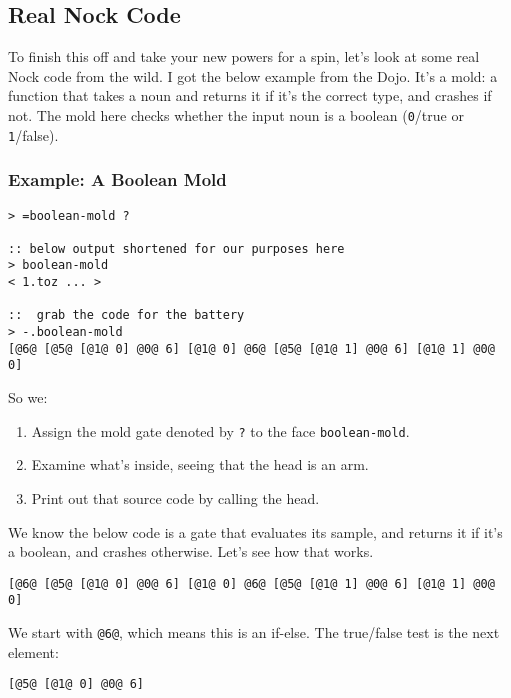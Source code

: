 \documentclass[twoside]{article}
\begin{document}
\subsection{Real Nock Code}

To finish this off and take your new powers for a spin, let's look at some real Nock code from the wild. I got the below example from the Dojo. It's a mold: a function that takes a noun and returns it if it's the correct type, and crashes if not. The mold here checks whether the input noun is a boolean (\lstinline[style=inlinecode]{0}/true or \lstinline[style=inlinecode]{1}/false).

\subsubsection{Example: A Boolean Mold}

\begin{lstlisting}[style=listingcode]
> =boolean-mold ?

:: below output shortened for our purposes here
> boolean-mold
< 1.toz ... >

::  grab the code for the battery
> -.boolean-mold
[@6@ [@5@ [@1@ 0] @0@ 6] [@1@ 0] @6@ [@5@ [@1@ 1] @0@ 6] [@1@ 1] @0@ 0]
\end{lstlisting}

\noindent{}
So we:

\begin{enumerate}
  \item  Assign the mold gate denoted by \lstinline[style=inlinecode]{?} to the face \lstinline[style=inlinecode]{boolean-mold}.
  \item  Examine what's inside, seeing that the head is an arm.
  \item  Print out that source code by calling the head.
\end{enumerate}

\noindent{}
We know the below code is a gate that evaluates its sample, and returns it if it's a boolean, and crashes otherwise. Let's see how that works.

\begin{lstlisting}[style=listingcode]
[@6@ [@5@ [@1@ 0] @0@ 6] [@1@ 0] @6@ [@5@ [@1@ 1] @0@ 6] [@1@ 1] @0@ 0]
\end{lstlisting}

\noindent{}
We start with \lstinline[style=inlinecode]{@6@}, which means this is an if-else. The true/false test is the next element:

\begin{lstlisting}[style=listingcode]
[@5@ [@1@ 0] @0@ 6]
\end{lstlisting}
\end{document}
